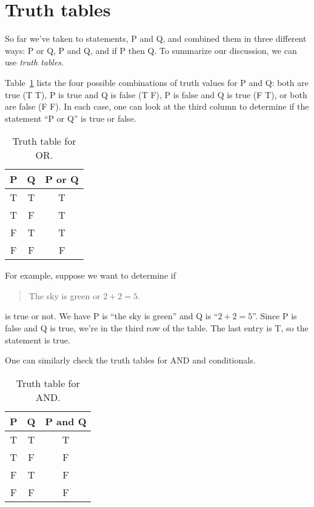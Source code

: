 \documentclass{tufte-book}
\begin{document}
\section{Truth tables}
\label{sec:truth-tables}

So far we've taken to statements, P and Q, and combined them in three different ways: P or Q, P and Q, and if P then Q. To summarize our discussion, we can use \emph{truth tables}. 

Table~\ref{tab:truth-table-or} lists the four possible combinations of truth values for P and Q: both are true (T T), P is true and Q is false (T F), P is false and Q is true (F T), or both are false (F F). In each case, one can look at the third column to determine if the statement ``P or Q'' is true or false.
\begin{table}
  \centering
  \begin{tabular}{ccc}
    \toprule
    P & Q & P or Q \\ \midrule
    T & T & T \\
    T & F & T \\
    F & T & T \\
    F & F & F \\ \bottomrule
  \end{tabular}
  \caption{Truth table for OR.}
  \label{tab:truth-table-or}
\end{table}

For example, suppose we want to determine if 
\begin{quote}
  The sky is green or $2 + 2 = 5$.
\end{quote}
is true or not. We have P is ``the sky is green'' and Q is ``$2 + 2 = 5$''. Since P is false and Q is true, we're in the third row of the table. The last entry is T, so the statement is true.

One can similarly check the truth tables for AND and conditionals.

\begin{table}
  \centering
  \begin{tabular}{ccc}
    \toprule
    P & Q & P and Q \\ \midrule
    T & T & T \\
    T & F & F \\
    F & T & F \\
    F & F & F \\ \bottomrule
  \end{tabular}
  \caption{Truth table for AND.}
  \label{tab:truth-table-and}
\end{table}
\end{document}
